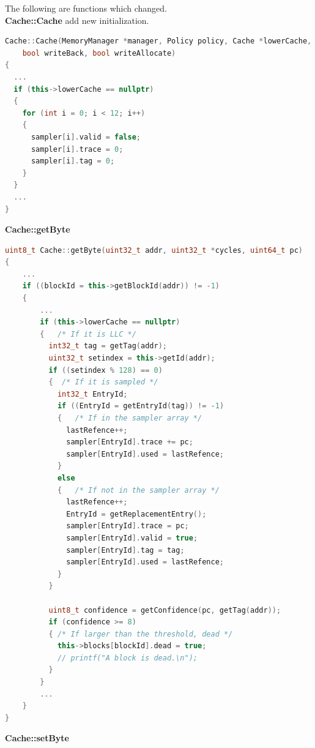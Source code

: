 \documentclass{article}
\begin{document}
The following are functions which changed.\\
\textbf{Cache::Cache} add new initialization.
\begin{lstlisting}[language=c++]
Cache::Cache(MemoryManager *manager, Policy policy, Cache *lowerCache,
    bool writeBack, bool writeAllocate)
{
  ...
  if (this->lowerCache == nullptr)
  {
    for (int i = 0; i < 12; i++)
    {
      sampler[i].valid = false;
      sampler[i].trace = 0;
      sampler[i].tag = 0;
    }
  }
  ...
}
\end{lstlisting}
\textbf{Cache::getByte}
\begin{lstlisting}[language=c++]
uint8_t Cache::getByte(uint32_t addr, uint32_t *cycles, uint64_t pc)
{
    ...
    if ((blockId = this->getBlockId(addr)) != -1)
    {
        ...
        if (this->lowerCache == nullptr)
        {   /* If it is LLC */
          int32_t tag = getTag(addr);
          uint32_t setindex = this->getId(addr);
          if ((setindex % 128) == 0)
          {  /* If it is sampled */
            int32_t EntryId;
            if ((EntryId = getEntryId(tag)) != -1)
            {   /* If in the sampler array */
              lastRefence++;
              sampler[EntryId].trace += pc;
              sampler[EntryId].used = lastRefence;
            }
            else
            {   /* If not in the sampler array */
              lastRefence++;
              EntryId = getReplacementEntry();
              sampler[EntryId].trace = pc;
              sampler[EntryId].valid = true;
              sampler[EntryId].tag = tag;
              sampler[EntryId].used = lastRefence;
            }
          }
    
          uint8_t confidence = getConfidence(pc, getTag(addr));
          if (confidence >= 8)
          { /* If larger than the threshold, dead */
            this->blocks[blockId].dead = true;
            // printf("A block is dead.\n");
          }
        }
        ...
    }
}
\end{lstlisting}
\textbf{Cache::setByte}
\end{document}
